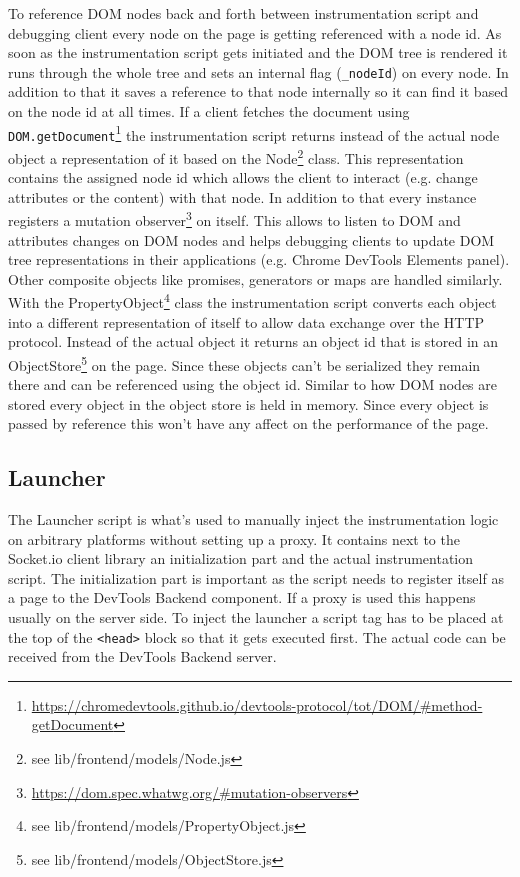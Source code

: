 To reference DOM nodes back and forth between instrumentation script and debugging client every node on
the page is getting referenced with a node id. As soon as the instrumentation script gets initiated and
the DOM tree is rendered it runs through the whole tree and sets an internal flag (\texttt{\_nodeId}) on
every node. In addition to that it saves a reference to that node internally so it can find it based
on the node id at all times. If a client fetches the document using \texttt{DOM.getDocument}\footnote{\url{https://chromedevtools.github.io/devtools-protocol/tot/DOM/\#method-getDocument}}
the instrumentation script returns instead of the actual node object a representation of it based on
the Node\footnote{see lib/frontend/models/Node.js} class. This representation contains the assigned node
id which allows the client to interact (e.g. change attributes or the content) with that node. In addition
to that every instance registers a mutation observer\footnote{\url{https://dom.spec.whatwg.org/\#mutation-observers}}
on itself. This allows to listen to DOM and attributes changes on DOM nodes and helps debugging clients
to update DOM tree representations in their applications (e.g. Chrome DevTools Elements panel). Other composite
objects like promises, generators or maps are handled similarly. With the PropertyObject\footnote{see lib/frontend/models/PropertyObject.js}
class the instrumentation script converts each object into a different representation of itself to allow
data exchange over the HTTP protocol. Instead of the actual object it returns an object id that is stored
in an ObjectStore\footnote{see lib/frontend/models/ObjectStore.js} on the page. Since these objects can't
be serialized they remain there and can be referenced using the object id. Similar to how DOM nodes are
stored every object in the object store is held in memory. Since every object is passed by reference this
won't have any affect on the performance of the page.

\subsection{Launcher\label{sec:launcher}}

The Launcher script is what's used to manually inject the instrumentation logic on arbitrary platforms
without setting up a proxy. It contains next to the Socket.io client library an initialization part and
the actual instrumentation script. The initialization part is important as the script needs to register
itself as a page to the DevTools Backend component. If a proxy is used this happens usually on the server
side. To inject the launcher a script tag has to be placed at the top of the \texttt{<head>} block so
that it gets executed first. The actual code can be received from the DevTools Backend server.

